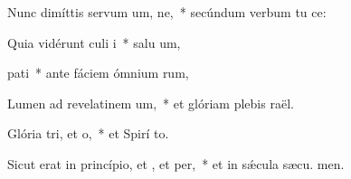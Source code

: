 \item Nunc dimíttis servum um, ne,~* secúndum verbum tu  ce:
\item Quia vidérunt culi i~* salu um,
\item {} pati~* ante fáciem ómnium rum,
\item Lumen ad revelatinem um,~* et glóriam plebis  raël.
\item Glória tri, et o,~* et Spirí to.
\item Sicut erat in princípio, et , et per,~* et in sǽcula sæcu. men.
